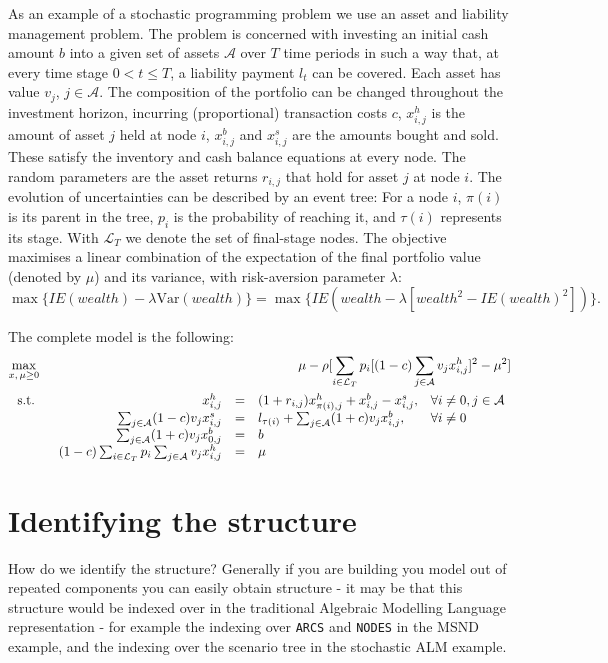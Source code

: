\documentclass[10pt,a4paper]{report}
\newcommand{\E}{\mbox{$I\!\!E$}}
\newcommand{\Var}{\mathrm{Var}}
\begin{document}
As an example of a stochastic programming problem we use an asset and
liability management problem.
The problem is concerned with investing an initial cash amount $b$ into
a given set of assets $\mathcal{A}$ over $T$ time periods in such a way
that, at every time stage $0 < t \le T$, a liability payment $l_t$ 
can be covered.
Each asset has value $v_j$, $j\in\mathcal{A}$.
The composition of the portfolio can be changed throughout the investment
horizon, incurring (proportional) transaction costs $c$,
$x_{i,j}^h$ is the amount of asset $j$ held at node $i$,
$x_{i,j}^b$ and $x_{i,j}^s$ are the amounts bought and sold.
These satisfy the inventory and cash balance equations at every node.
The random parameters are the asset returns $r_{i,j}$ that hold
for asset $j$ at node $i$.
The evolution of uncertainties can be described by an event tree:
For a node $i$, $\pi(i)$ is its parent in the tree,
$p_i$ is the probability of reaching it, 
and $\tau(i)$ represents its stage.
With $\mathcal{L}_T$ we denote the set of final-stage nodes.
%
The objective maximises a linear combination of the expectation of the final
portfolio value (denoted by $\mu$) and its variance, with risk-aversion
parameter $\lambda$:
\[
 \max \{\E(wealth) - \lambda\Var(wealth)\} = 
 \max \{\E\left(wealth - \lambda \left[wealth^2 - \E(wealth)^2\right]\right)\}.
\]


The complete model is the following:
\begin{eqnarray}
\max_{x,\,\mu\ge 0}&& \mu - \rho[\sum_{i\in\mathcal{L}_T}
p_i [(1-c)\sum_{j\in\mathcal{A}} v_j x_{i,j}^h]^2 - \mu^2]\notag\\
\text{~s.t.~}&&
\begin{array}[t]{rcll}
x_{i,j}^h &=& (1+r_{i,j})x_{\pi(i),j}^h +  x_{i,j}^b - x_{i,j}^s,&\forall i\ne 0, j\in\mathcal{A}\\
\sum_{j\in\mathcal{A}} (1-c) v_j x_{i,j}^s &=& l_{\tau(i)} + \sum_{j\in\mathcal{A}} (1+c) v_j x_{i,j}^b, &\forall i\ne 0\\ 
\sum_{j\in\mathcal{A}} (1+c) v_j x_{0,j}^b &=& b\\
 (1-c) \sum_{i\in \mathcal{L}_T} p_i\sum_{j\in\mathcal{A}} v_j x_{i,j}^h &=& \mu
\end{array}
\label{alm}
\end{eqnarray}

\section{Identifying the structure}

How do we identify the structure? Generally if you are building you model out
of repeated components you can easily obtain structure - it may be that this
structure would be indexed over in the traditional Algebraic Modelling Language
representation - for example the indexing over {\tt ARCS} and {\tt NODES} in
the MSND example, and the indexing over the scenario tree in the stochastic
ALM example.
\end{document}
